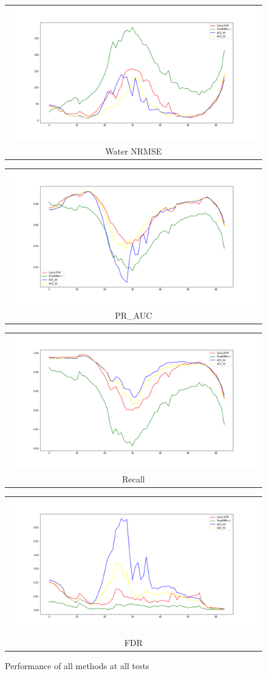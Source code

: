 \begin{figure}
    \begin{center}
        \begin{tabular}[b]{c}
            \includegraphics[width=.4\linewidth]{figures/chap4/w_nrmse_all_tests.png} \\
            \small Water NRMSE
          \end{tabular}
          \begin{tabular}[b]{c}
            \includegraphics[width=.4\linewidth]{figures/chap4/pr_auc_all_tests.png} \\
            \small PR\_AUC
          \end{tabular}
          \begin{tabular}[b]{c}
              \includegraphics[width=.4\linewidth]{figures/chap4/recall_all_tests.png} \\
              \small Recall
          \end{tabular} 
          \begin{tabular}[b]{c}
              \includegraphics[width=.4\linewidth]{figures/chap4/fdr_all_tests.png} \\
              \small FDR
          \end{tabular}
    \end{center}
    \caption[]{Performance of all methods at all tests}
    \label{fig:chap4-performance-all-tests}
\end{figure}

